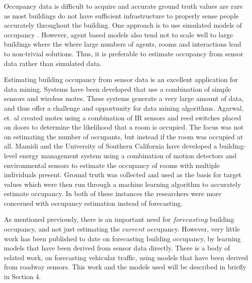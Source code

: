\documentclass{acm_proc_article-sp}
\begin{document}
Occupancy data is difficult to acquire and accurate ground truth values are rare as most buildings do not have sufficient infrastructure to properly sense people accurately throughout the building.  One approach is to use simulated models of occupancy \cite{PAGE2008, GOLDSTEIN2010}.  However, agent based models also tend not to scale well to large buildings where the where large numbers of agents, rooms and interactions lead to non-trivial solutions.  Thus, it is preferable to estimate occupancy from sensor data rather than simulated data.

Estimating building occupancy from sensor data is an excellent application for data mining.  Systems have been developed that use a combination of simple sensors and wireless motes.  These systems generate a very large amount of data, and thus offer a challenge and opportunity for data mining algorithms.  Agarwal, et. al \cite{Agarwal2010} created motes using a combination of IR sensors and reed switches placed on doors to determine the likelihood that a room is occupied.  The focus was not on estimating the number of occupants, but instead if the room was occupied at all.  Mamidi \cite{Mamidi2012} and the University of Southern California have developed a building-level energy management system using a combination of motion detectors and environmental sensors to estimate the occupancy of rooms with multiple individuals present.  Ground truth was collected and used as the basis for target values which were then run through a machine learning algorithm to accurately estimate occupancy.  In both of these instances the researchers were more concerned with occupancy estimation instead of forecasting.

As mentioned previously, there is an important need for $forecasting$ building occupancy, and not just estimating the $current$ occupancy.  However, very little work has been published to date on forecasting building occupancy, by learning models that have been derived from sensor data directly.  There is a body of related work, on forecasting vehicular traffic, using models that have been derived from roadway sensors.  This work and the models used will be described in briefly in Section 4.
\end{document}
